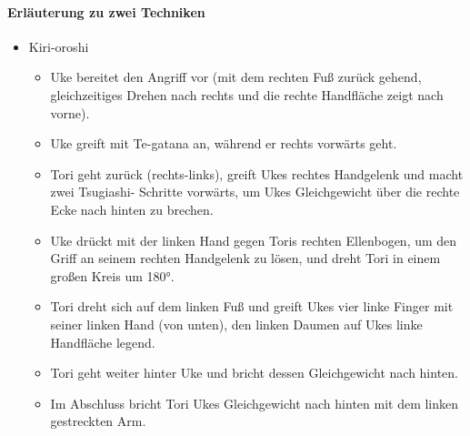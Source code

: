 \documentclass[justified, a4paper, notitlepage, captions=tableheading, nobib]{tufte-handout}
\begin{document}
\paragraph{Erläuterung zu zwei Techniken}
\label{sec:org624e453}
\begin{itemize}
\item \label{org16eadd0}Kiri-oroshi
\begin{itemize}
\item Uke bereitet den Angriff vor (mit dem rechten Fuß zurück gehend, gleichzeitiges Drehen nach rechts und die rechte Handfläche zeigt nach vorne).
\item Uke greift mit Te-gatana an, während er rechts vorwärts geht.
\item Tori geht zurück (rechts-links), greift Ukes rechtes Handgelenk und macht zwei Tsugiashi- Schritte vorwärts, um Ukes Gleichgewicht über die rechte Ecke nach hinten zu brechen.
\item Uke drückt mit der linken Hand gegen Toris rechten Ellenbogen, um den Griff an seinem rechten Handgelenk zu lösen, und dreht Tori in einem großen Kreis um 180°.
\item Tori dreht sich auf dem linken Fuß und greift Ukes vier linke Finger mit seiner linken Hand (von unten), den linken Daumen auf Ukes linke Handfläche legend.
\item Tori geht weiter hinter Uke und bricht dessen Gleichgewicht nach hinten.
\item Im Abschluss bricht Tori Ukes Gleichgewicht nach hinten mit dem linken gestreckten Arm.
\end{itemize}


\end{itemize}
\end{document}
